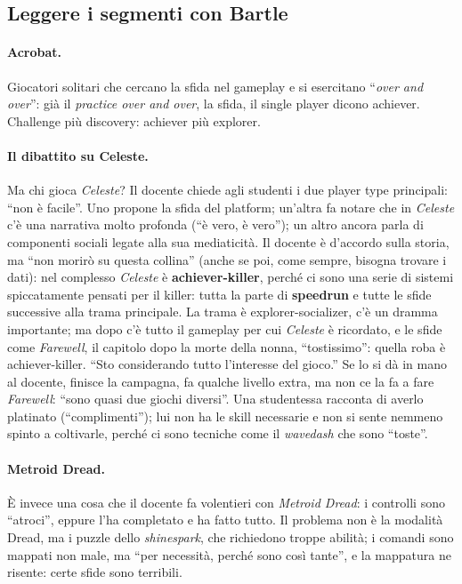 \subsection{Leggere i segmenti con Bartle}

\paragraph{Acrobat.} Giocatori solitari che cercano la sfida nel gameplay e si
esercitano ``\emph{over and over}'': già il \emph{practice over and over}, la sfida,
il single player dicono achiever. Challenge più discovery: achiever più explorer.

\paragraph{Il dibattito su Celeste.} Ma chi gioca \emph{Celeste}? Il docente chiede
agli studenti i due player type principali: ``non è facile''. Uno propone la sfida
del platform; un'altra fa notare che in \emph{Celeste} c'è una narrativa molto
profonda (``è vero, è vero''); un altro ancora parla di componenti sociali legate
alla sua mediaticità. Il docente è d'accordo sulla storia, ma ``non morirò su questa
collina'' (anche se poi, come sempre, bisogna trovare i dati): nel complesso
\emph{Celeste} è \textbf{achiever-killer}, perché ci sono una serie di sistemi
spiccatamente pensati per il killer: tutta la parte di \textbf{speedrun} e tutte le
sfide successive alla trama principale. La trama è explorer-socializer, c'è un
dramma importante; ma dopo c'è tutto il gameplay per cui \emph{Celeste} è ricordato,
e le sfide come \emph{Farewell}, il capitolo dopo la morte della nonna, ``tostissimo'':
quella roba è achiever-killer. ``Sto considerando tutto l'interesse del gioco.'' Se lo
si dà in mano al docente, finisce la campagna, fa qualche livello extra, ma non ce la
fa a fare \emph{Farewell}: ``sono quasi due giochi diversi''. Una studentessa racconta
di averlo platinato (``complimenti''); lui non ha le skill necessarie e non si sente
nemmeno spinto a coltivarle, perché ci sono tecniche come il \emph{wavedash} che sono
``toste''.

\paragraph{Metroid Dread.} È invece una cosa che il docente fa volentieri con
\emph{Metroid Dread}: i controlli sono ``atroci'', eppure l'ha completato e ha fatto
tutto. Il problema non è la modalità Dread, ma i puzzle dello \emph{shinespark}, che
richiedono troppe abilità; i comandi sono mappati non male, ma ``per necessità,
perché sono così tante'', e la mappatura ne risente: certe sfide sono terribili.

